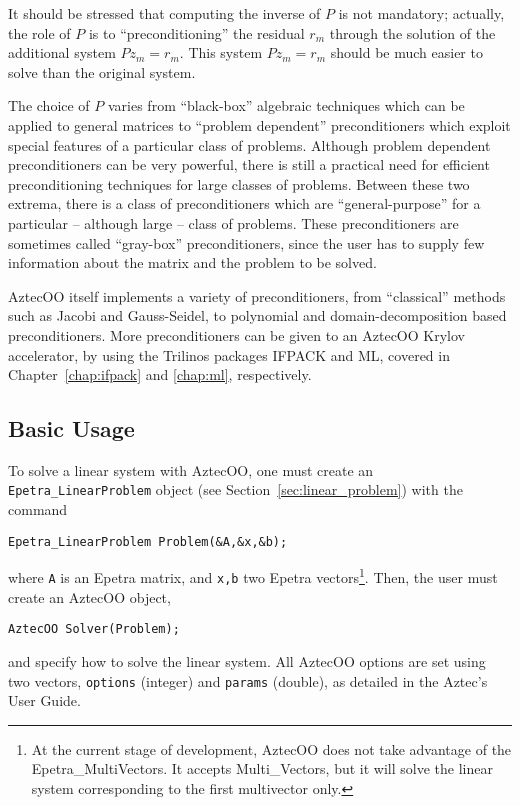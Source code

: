 It should be stressed that computing the inverse of $P$ is not
mandatory; actually, the role of $P$ is to ``preconditioning'' the
residual $r_m$ through the solution of the additional system $P
z_m = r_m$. This system $P z_m = {r}_m$ should be much
easier to solve than the original system. 

\smallskip

The choice of $P$ varies from ``black-box'' algebraic techniques which
can be applied to general matrices to ``problem dependent''
preconditioners which exploit special features of a particular class
of problems. Although problem dependent preconditioners can be very
powerful, there is still a practical need for efficient
preconditioning techniques for large classes of problems. Between
these two extrema, there is a class of preconditioners which are
``general-purpose'' for a particular -- although large -- class of
problems.  These preconditioners are sometimes called ``gray-box''
preconditioners, since the user has to supply few information about
the matrix and the problem to be solved.

AztecOO itself implements a variety of preconditioners, from
``classical'' methods such as Jacobi and Gauss-Seidel, to polynomial and
domain-decomposition based preconditioners. More preconditioners can be
given to an AztecOO Krylov accelerator, by using the Trilinos packages
IFPACK and ML, covered in Chapter~\ref{chap:ifpack} and \ref{chap:ml},
respectively.


\subsection{Basic Usage}
\label{sec:basic_aztecoo}

To solve a linear system with AztecOO, one must create an
\verb!Epetra_LinearProblem!  object (see
Section~\ref{sec:linear_problem}) with the command
\begin{verbatim}
Epetra_LinearProblem Problem(&A,&x,&b);
\end{verbatim}
where \verb!A! is an Epetra matrix, and \verb!x,b! two Epetra
vectors\footnote{At the current stage of development, AztecOO does not
  take advantage of the Epetra\_MultiVectors. It accepts Multi\_Vectors,
  but it will solve the linear system corresponding to the first
  multivector only.}.  Then, the user must create an AztecOO object,
\begin{verbatim}
AztecOO Solver(Problem);
\end{verbatim}
and specify how to solve the linear system. All AztecOO options are set
using two vectors, \verb!options! (integer) and \verb!params! (double),
as detailed in the Aztec's User Guide.

